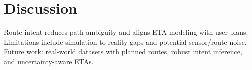 \section{Discussion}
Route intent reduces path ambiguity and aligns ETA modeling with user plans. Limitations include simulation-to-reality gaps and potential sensor/route noise. Future work: real-world datasets with planned routes, robust intent inference, and uncertainty-aware ETAs.
